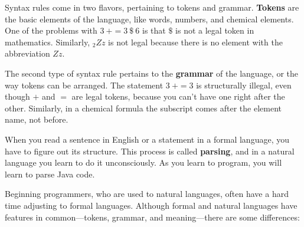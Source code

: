 \documentclass[12pt]{book}
\makeatletter
\theoremstyle{exercise}
\renewcommand\subsection{\@startsection{subsection}{2}{\z@}%
    {-3.25ex\@plus -1ex \@minus -.2ex}%
    {0.3ex \@plus .2ex}%
    {\normalfont\large\bfseries}}
\makeatother
\begin{document}


Syntax rules come in two flavors, pertaining to tokens and grammar.
{\bf Tokens} are the basic elements of the language, like words, numbers, and chemical elements.
One of the problems with $3\ + = 3\ \$\ 6$ is that $\$$ is not a legal token in mathematics.
Similarly, $_2Zz$ is not legal because there is no element with the abbreviation $Zz$.


The second type of syntax rule pertains to the {\bf grammar} of the language, or the way tokens can be arranged.
The statement $3\ + = 3$ is structurally illegal, even though $+$ and $=$ are legal tokens, because you can't have one right after the other.
Similarly, in a chemical formula the subscript comes after the element name, not before.


When you read a sentence in English or a statement in a formal language, you have to figure out its structure.
This process is called {\bf parsing}, and in a natural language you learn to do it unconsciously.
As you learn to program, you will learn to parse Java code.



Beginning programmers, who are used to natural languages, often have a hard time adjusting to formal languages.
Although formal and natural languages have features in common---tokens, grammar, and meaning---there are some differences:
\end{document}
